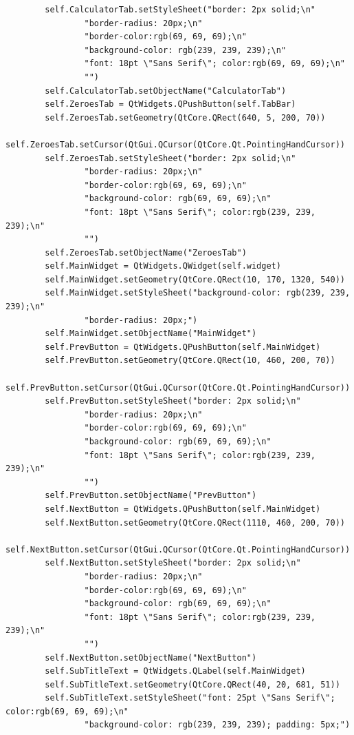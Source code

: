\documentclass{article}
\begin{document}
\begin{lstlisting}
        self.CalculatorTab.setStyleSheet("border: 2px solid;\n"
                "border-radius: 20px;\n"
                "border-color:rgb(69, 69, 69);\n"
                "background-color: rgb(239, 239, 239);\n"
                "font: 18pt \"Sans Serif\"; color:rgb(69, 69, 69);\n"
                "")
        self.CalculatorTab.setObjectName("CalculatorTab")
        self.ZeroesTab = QtWidgets.QPushButton(self.TabBar)
        self.ZeroesTab.setGeometry(QtCore.QRect(640, 5, 200, 70))
        self.ZeroesTab.setCursor(QtGui.QCursor(QtCore.Qt.PointingHandCursor))
        self.ZeroesTab.setStyleSheet("border: 2px solid;\n"
                "border-radius: 20px;\n"
                "border-color:rgb(69, 69, 69);\n"
                "background-color: rgb(69, 69, 69);\n"
                "font: 18pt \"Sans Serif\"; color:rgb(239, 239, 239);\n"
                "")
        self.ZeroesTab.setObjectName("ZeroesTab")
        self.MainWidget = QtWidgets.QWidget(self.widget)
        self.MainWidget.setGeometry(QtCore.QRect(10, 170, 1320, 540))
        self.MainWidget.setStyleSheet("background-color: rgb(239, 239, 239);\n"
                "border-radius: 20px;")
        self.MainWidget.setObjectName("MainWidget")
        self.PrevButton = QtWidgets.QPushButton(self.MainWidget)
        self.PrevButton.setGeometry(QtCore.QRect(10, 460, 200, 70))
        self.PrevButton.setCursor(QtGui.QCursor(QtCore.Qt.PointingHandCursor))
        self.PrevButton.setStyleSheet("border: 2px solid;\n"
                "border-radius: 20px;\n"
                "border-color:rgb(69, 69, 69);\n"
                "background-color: rgb(69, 69, 69);\n"
                "font: 18pt \"Sans Serif\"; color:rgb(239, 239, 239);\n"
                "")
        self.PrevButton.setObjectName("PrevButton")
        self.NextButton = QtWidgets.QPushButton(self.MainWidget)
        self.NextButton.setGeometry(QtCore.QRect(1110, 460, 200, 70))
        self.NextButton.setCursor(QtGui.QCursor(QtCore.Qt.PointingHandCursor))
        self.NextButton.setStyleSheet("border: 2px solid;\n"
                "border-radius: 20px;\n"
                "border-color:rgb(69, 69, 69);\n"
                "background-color: rgb(69, 69, 69);\n"
                "font: 18pt \"Sans Serif\"; color:rgb(239, 239, 239);\n"
                "")
        self.NextButton.setObjectName("NextButton")
        self.SubTitleText = QtWidgets.QLabel(self.MainWidget)
        self.SubTitleText.setGeometry(QtCore.QRect(40, 20, 681, 51))
        self.SubTitleText.setStyleSheet("font: 25pt \"Sans Serif\"; color:rgb(69, 69, 69);\n"
                "background-color: rgb(239, 239, 239); padding: 5px;")

\end{lstlisting}
\end{document}
